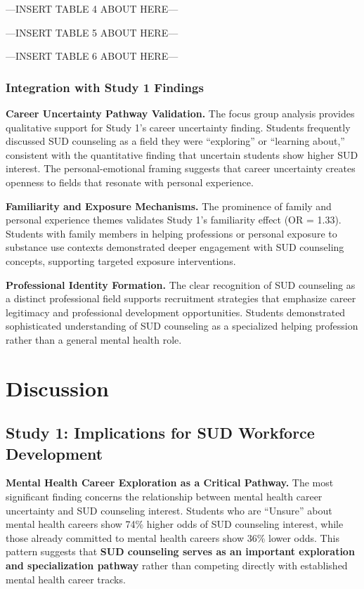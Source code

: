 \documentclass[
  man,
  longtable,
  nolmodern,
  notxfonts,
  notimes,
  colorlinks=true,linkcolor=blue,citecolor=blue,urlcolor=blue]{apa7}
\begin{document}
---INSERT TABLE 4 ABOUT HERE---

---INSERT TABLE 5 ABOUT HERE---

---INSERT TABLE 6 ABOUT HERE---

\subsubsection{Integration with Study 1
Findings}\label{integration-with-study-1-findings}

\textbf{Career Uncertainty Pathway Validation.} The focus group analysis
provides qualitative support for Study 1's career uncertainty finding.
Students frequently discussed SUD counseling as a field they were
``exploring'' or ``learning about,'' consistent with the quantitative
finding that uncertain students show higher SUD interest. The
personal-emotional framing suggests that career uncertainty creates
openness to fields that resonate with personal experience.

\textbf{Familiarity and Exposure Mechanisms.} The prominence of family
and personal experience themes validates Study 1's familiarity effect
(OR = 1.33). Students with family members in helping professions or
personal exposure to substance use contexts demonstrated deeper
engagement with SUD counseling concepts, supporting targeted exposure
interventions.

\textbf{Professional Identity Formation.} The clear recognition of SUD
counseling as a distinct professional field supports recruitment
strategies that emphasize career legitimacy and professional development
opportunities. Students demonstrated sophisticated understanding of SUD
counseling as a specialized helping profession rather than a general
mental health role.

\section{Discussion}\label{discussion}

\subsection{Study 1: Implications for SUD Workforce
Development}\label{study-1-implications-for-sud-workforce-development}

\textbf{Mental Health Career Exploration as a Critical Pathway.} The
most significant finding concerns the relationship between mental health
career uncertainty and SUD counseling interest. Students who are
``Unsure'' about mental health careers show 74\% higher odds of SUD
counseling interest, while those already committed to mental health
careers show 36\% lower odds. This pattern suggests that \textbf{SUD
counseling serves as an important exploration and specialization
pathway} rather than competing directly with established mental health
career tracks.
\end{document}
